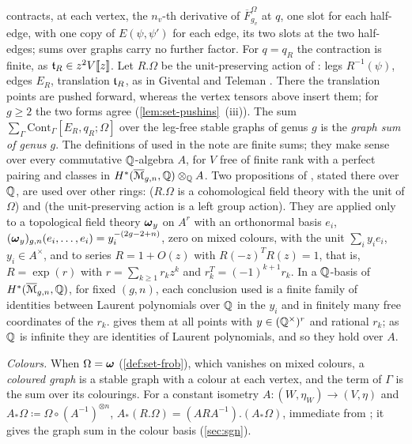 \begin{defn}
contracts, at each vertex, the $n_v$-th derivative of $\overline F^\Omega_{g_v}$ at $q$, one slot for each half-edge, with one copy of $E(\psi,\psi')$ for each edge, its two slots at the two half-edges; sums over graphs carry no further factor. For $q=q_R$ the contraction is finite, as $\mathfrak{t}_R\in z^2V[\![ z ]\!]$. Let $R.\Omega$ be the unit-preserving action of \cite[Defs.~2.2, 2.5, 2.13]{PPZ15}: legs $R^{-1}(\psi)$, edges $E_R$, translation $\mathfrak{t}_R$, as in Givental and Teleman \cite[p.~20]{PPZ15}. There the translation points are pushed forward, whereas the vertex tensors above insert them; for $g\geq2$ the two forms agree (\cref{lem:set-pushins}~(iii)). The sum $\sum_\Gamma\mathrm{Cont}_\Gamma[E_R,q_R;\Omega]$ over the leg-free stable graphs of genus $g$ is the \emph{graph sum of genus $g$}. The definitions of \cite{PPZ15} used in the note are finite sums; they make sense over every commutative $\mathbb{Q}$-algebra $A$, for $V$ free of finite rank with a perfect pairing and classes in $H^*(\overline{\mathcal M}_{g,n},\mathbb{Q})\otimes_{\mathbb{Q}} A$. Two propositions of \cite{PPZ15}, stated there over $\mathbb{Q}$, are used over other rings: \cite[Prop.~2.12]{PPZ15} ($R.\Omega$ is a cohomological field theory with the unit of $\Omega$) and \cite[Prop.~2.14]{PPZ15} (the unit-preserving action is a left group action). They are applied only to a topological field theory $\boldsymbol{\omega}_y$ on $A^r$ with an orthonormal basis $e_i$, $(\boldsymbol{\omega}_y)_{g,n}(e_i,\dots,e_i)=y_i^{-(2g-2+n)}$, zero on mixed colours, with the unit $\sum_iy_ie_i$, $y_i\in A^\times$, and to series $R=1+O(z)$ with $R(-z)^TR(z)=1$, that is, $R=\exp(r)$ with $r=\sum_{k\geq1}r_kz^k$ and $r_k^T=(-1)^{k+1}r_k$. In a $\mathbb{Q}$-basis of $H^*(\overline{\mathcal M}_{g,n},\mathbb{Q})$, for fixed $(g,n)$, each conclusion used is a finite family of identities between Laurent polynomials over $\mathbb{Q}$ in the $y_i$ and in finitely many free coordinates of the $r_k$. \cite{PPZ15} gives them at all points with $y\in(\mathbb{Q}^\times)^r$ and rational $r_k$; as $\mathbb{Q}$ is infinite they are identities of Laurent polynomials, and so they hold over $A$.

\emph{Colours.} When $\Omega=\boldsymbol{\omega}$ (\cref{def:set-frob}), which vanishes on mixed colours, a \emph{coloured graph} is a stable graph with a colour at each vertex, and the term of $\Gamma$ is the sum over its colourings. For a constant isometry $A\colon(W,\eta_W)\to(V,\eta)$ and $A_*\Omega\coloneqq\Omega\circ(A^{-1})^{\otimes n}$, $A_*(R.\Omega)=(ARA^{-1}).(A_*\Omega)$, immediate from \cite[Defs.~2.2, 2.13]{PPZ15}; it gives the graph sum in the colour basis (\cref{sec:sgn}).
\end{defn}


